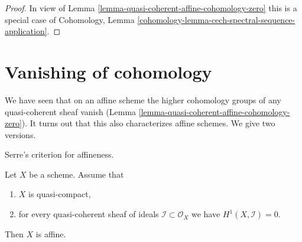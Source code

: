 \begin{proof}
In view of
Lemma \ref{lemma-quasi-coherent-affine-cohomology-zero}
this is a special case of
Cohomology, Lemma
\ref{cohomology-lemma-cech-spectral-sequence-application}.
\end{proof}







\section{Vanishing of cohomology}
\label{section-vanishing}

\noindent
We have seen that on an affine scheme the higher cohomology groups
of any quasi-coherent sheaf vanish
(Lemma \ref{lemma-quasi-coherent-affine-cohomology-zero}).
It turns out that this also
characterizes affine schemes. We give two versions.

\begin{lemma}
\label{lemma-quasi-compact-h1-zero-covering}
\begin{reference}
\cite{Serre-criterion}
\end{reference}
\begin{slogan}
Serre's criterion for affineness.
\end{slogan}
Let $X$ be a scheme.
Assume that
\begin{enumerate}
\item $X$ is quasi-compact,
\item for every quasi-coherent sheaf of ideals
$\mathcal{I} \subset \mathcal{O}_X$ we have $H^1(X, \mathcal{I}) = 0$.
\end{enumerate}
Then $X$ is affine.
\end{lemma}

